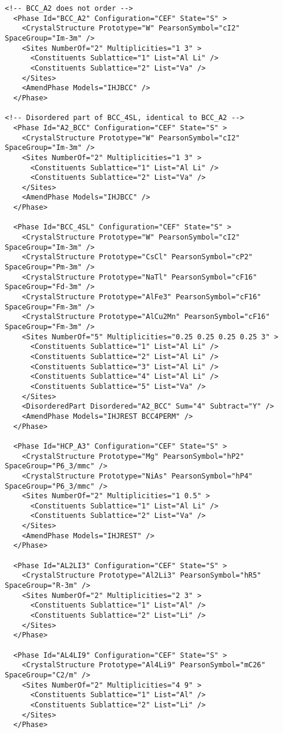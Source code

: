 \documentclass{article}
\begin{document}
\begin{appendices}
\begin{verbatim}
<!-- BCC_A2 does not order -->
  <Phase Id="BCC_A2" Configuration="CEF" State="S" >
	<CrystalStructure Prototype="W" PearsonSymbol="cI2" SpaceGroup="Im-3m" />
    <Sites NumberOf="2" Multiplicities="1 3" >
      <Constituents Sublattice="1" List="Al Li" />
      <Constituents Sublattice="2" List="Va" />
    </Sites>
    <AmendPhase Models="IHJBCC" />
  </Phase>

<!-- Disordered part of BCC_4SL, identical to BCC_A2 -->
  <Phase Id="A2_BCC" Configuration="CEF" State="S" >
	<CrystalStructure Prototype="W" PearsonSymbol="cI2" SpaceGroup="Im-3m" />
    <Sites NumberOf="2" Multiplicities="1 3" >
      <Constituents Sublattice="1" List="Al Li" />
      <Constituents Sublattice="2" List="Va" />
    </Sites>
    <AmendPhase Models="IHJBCC" />
  </Phase>

  <Phase Id="BCC_4SL" Configuration="CEF" State="S" >
	<CrystalStructure Prototype="W" PearsonSymbol="cI2" SpaceGroup="Im-3m" />
	<CrystalStructure Prototype="CsCl" PearsonSymbol="cP2" SpaceGroup="Pm-3m" />
	<CrystalStructure Prototype="NaTl" PearsonSymbol="cF16" SpaceGroup="Fd-3m" />
	<CrystalStructure Prototype="AlFe3" PearsonSymbol="cF16" SpaceGroup="Fm-3m" />
	<CrystalStructure Prototype="AlCu2Mn" PearsonSymbol="cF16" SpaceGroup="Fm-3m" />
    <Sites NumberOf="5" Multiplicities="0.25 0.25 0.25 0.25 3" >
      <Constituents Sublattice="1" List="Al Li" />
      <Constituents Sublattice="2" List="Al Li" />
      <Constituents Sublattice="3" List="Al Li" />
      <Constituents Sublattice="4" List="Al Li" />
      <Constituents Sublattice="5" List="Va" />
    </Sites>
    <DisorderedPart Disordered="A2_BCC" Sum="4" Subtract="Y" />
    <AmendPhase Models="IHJREST BCC4PERM" />
  </Phase>

  <Phase Id="HCP_A3" Configuration="CEF" State="S" >
	<CrystalStructure Prototype="Mg" PearsonSymbol="hP2" SpaceGroup="P6_3/mmc" />
	<CrystalStructure Prototype="NiAs" PearsonSymbol="hP4" SpaceGroup="P6_3/mmc" />
    <Sites NumberOf="2" Multiplicities="1 0.5" >
      <Constituents Sublattice="1" List="Al Li" />
      <Constituents Sublattice="2" List="Va" />
    </Sites>
    <AmendPhase Models="IHJREST" />
  </Phase>

  <Phase Id="AL2LI3" Configuration="CEF" State="S" >
	<CrystalStructure Prototype="Al2Li3" PearsonSymbol="hR5" SpaceGroup="R-3m" />
    <Sites NumberOf="2" Multiplicities="2 3" >
      <Constituents Sublattice="1" List="Al" />
      <Constituents Sublattice="2" List="Li" />
    </Sites>
  </Phase>

  <Phase Id="AL4LI9" Configuration="CEF" State="S" >
	<CrystalStructure Prototype="Al4Li9" PearsonSymbol="mC26" SpaceGroup="C2/m" />
    <Sites NumberOf="2" Multiplicities="4 9" >
      <Constituents Sublattice="1" List="Al" />
      <Constituents Sublattice="2" List="Li" />
    </Sites>
  </Phase>


\end{verbatim}
\end{appendices}
\end{document}
